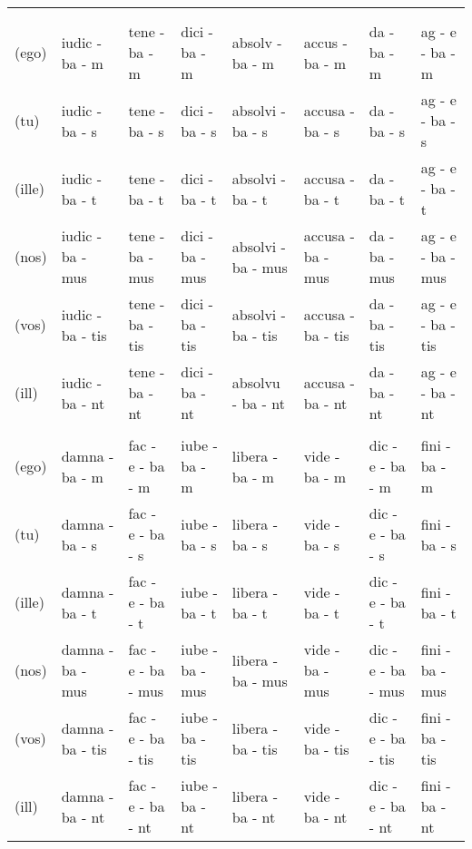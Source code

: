 \documentclass[a4paper, landscape]{article}
\begin{document}
\begin{landscape}
\begin{table}[]
\begin{tabular}{llllllll}
	& & & & &  &  & \\
	& & & &  &  & \\
	(ego)	& iudic - ba - m   & tene - ba - m	 & dici - ba - m   & absolv - ba - m	& accus  - ba - m   & da - ba - m	& ag - e - ba - m \\ 
	(tu)	& iudic - ba - s   & tene - ba - s 	 & dici - ba - s   & absolvi - ba - s	& accusa - ba - s   & da - ba - s	& ag - e - ba - s \\
	(ille)	& iudic - ba - t   & tene - ba - t	 & dici - ba - t   & absolvi - ba - t	& accusa - ba - t   & da - ba - t	& ag - e - ba - t \\
	(nos)	& iudic - ba - mus & tene - ba - mus & dici - ba - mus & absolvi - ba - mus & accusa - ba - mus & da - ba - mus	& ag - e - ba - mus \\
	(vos)	& iudic - ba - tis & tene - ba - tis & dici - ba - tis & absolvi - ba - tis & accusa - ba - tis & da - ba - tis	& ag - e - ba - tis \\
	(ill)	& iudic - ba - nt  & tene - ba - nt  & dici - ba - nt  & absolvu - ba - nt	& accusa - ba - nt  & da - ba - nt	& ag - e - ba -nt \\
	& & & &  &  &  & \\
	(ego)	& damna - ba - m	& fac - e - ba - m		& iube - ba - m   & libera - ba - m   & vide - ba - m   & dic - e - ba - m	 & fini - ba - m  \\ 
	(tu)	& damna - ba - s	& fac - e - ba - s		& iube - ba - s	  & libera - ba - s   & vide - ba - s	& dic - e - ba - s	 & fini - ba - s \\
	(ille)	& damna - ba - t	& fac - e - ba - t		& iube - ba - t	  & libera - ba - t   & vide - ba - t	& dic - e - ba - t 	 & fini - ba - t  \\
	(nos)	& damna - ba - mus	& fac - e - ba - mus	& iube - ba - mus & libera - ba - mus & vide - ba - mus & dic - e - ba - mus & fini - ba - mus \\
	(vos)	& damna - ba - tis	& fac - e - ba - tis	& iube - ba - tis & libera - ba - tis & vide - ba - tis & dic - e - ba - tis & fini - ba - tis \\
	(ill)	& damna - ba - nt	& fac - e - ba - nt 	& iube - ba - nt  & libera - ba - nt  & vide - ba - nt  & dic - e - ba - nt	 & fini - ba - nt \\
\end{tabular}
\end{table}
\end{landscape}
\end{document}
